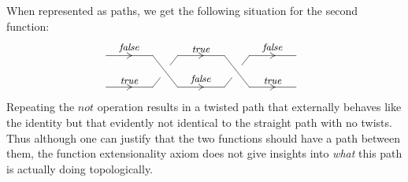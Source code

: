 \documentclass[11pt]{article}
\makeatletter
\def\wirechart#1#2{\let\labelstyle\objectstyle\xy*[*1.0]\xybox{\small%
\xymatrix@C=10mm@R=4mm#1{#2}}\endxy}
\def\wire#1#2{\ar@{-}[#1]^<>(.5){#2}}
\def\wireright#1#2{\wire{#1}{#2}\ar@{}[#1]|<>(.5)/.6ex/{\dir2{>}}}
\def\wwblank#1{*=<#1,0mm>{~}}
\def\blank{\wwblank{8mm}}
\def\wirecross#1{\save[]!L;[#1]!R**@{-}\restore}
\def\wirebraid#1#2{\save[]!L;[#1]!R**{}?(#2)**@{-}\restore\save[#1]!R;[]!L**{}?(#2)**@{-}\restore}
\newcommand{\sym}{c}       %
\newcommand{\cp}{\circ}                 %
\newcommand{\symi}{\sym\inv}
\newcommand{\inv}{^{-1}}
\newcommand{\id}{\textrm{\rm id}}       %
\newcommand{\x}{\otimes}
\newcommand{\ffv}{\mathit{false}}
\newcommand{\ttv}{\mathit{true}}
\newcommand{\notb}{\mathit{not}}
\makeatother
\begin{document}
When represented as paths, we get the following situation for the second
function:
\[\vcenter{\wirechart{@C=1.5cm@R=0.8cm}{
    *{}\wireright{r}{\ffv}&
    \blank\wirecross{d}\wireright{r}{\ttv}&
    \blank\wirecross{d}\wireright{r}{\ffv}&
    \\
    *{}\wireright{r}{\ttv}&
    \blank\wirebraid{u}{.3}\wireright{r}{\ffv}&
    \blank\wirebraid{u}{.3}\wireright{r}{\ttv}&
    \\
    }}
\]
Repeating the $\notb$ operation results in a twisted path that externally
behaves like the identity but that evidently not identical to the straight
path with no twists. Thus although one can justify that the two functions
should have a path between them, the function extensionality axiom does not
give insights into \emph{what} this path is actually doing topologically.

















\end{document}
